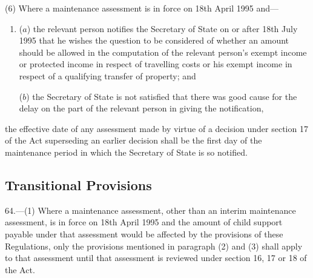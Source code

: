 \documentclass[12pt,a4paper]{article}
\begin{document}
%

(6) Where a maintenance assessment is in force on 18th April 1995 and—
\begin{enumerate}\item[]
($a$) the relevant person notifies the Secretary of State on or after 18th July 1995 that he wishes 
the question to be considered  %
of whether an amount should be allowed in the computation of the relevant person’s exempt income or protected income in respect of travelling costs or his exempt income in respect of a qualifying transfer of property; and

($b$) the Secretary of State is not satisfied that there was good cause for the delay on the part of the relevant person in giving the notification,
\end{enumerate}
the effective date of any assessment made 
by virtue of a decision under section 17 of the Act superseding an earlier decision  %
shall be the first day of the maintenance period in which the Secretary of State is so notified.


\subsection[64. Transitional Provisions]{Transitional Provisions}

64.—(1) Where a maintenance assessment, other than an interim maintenance assessment, is in force on 18th April 1995 
and  %
the amount of child support payable under that assessment would be affected by the provisions of these Regulations, only the provisions mentioned in paragraph (2) and (3) shall apply to that assessment until that assessment is reviewed under section 16, 17 or 18 of the Act.
\end{document}
